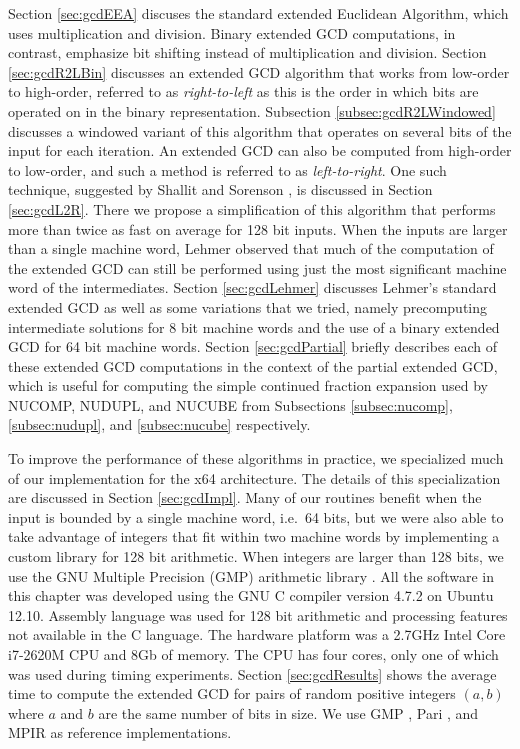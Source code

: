 \documentclass{ucalgthes1}
\theoremstyle{definition}
\newcommand{\compiler}{GNU C compiler version 4.7.2}
\newcommand{\cpu}{2.7GHz Intel Core i7-2620M CPU}
\begin{document}
Section \ref{sec:gcdEEA} discuses the standard extended Euclidean Algorithm, which uses multiplication and division.  Binary extended GCD computations, in contrast, emphasize bit shifting instead of multiplication and division.  Section \ref{sec:gcdR2LBin} discusses an extended GCD algorithm that works from low-order to high-order, referred to as \emph{right-to-left} as this is the order in which bits are operated on in the binary representation.  Subsection \ref{subsec:gcdR2LWindowed} discusses a windowed variant of this algorithm that operates on several bits of the input for each iteration.  An extended GCD can also be computed from high-order to low-order, and such a method is referred to as \emph{left-to-right}.  One such technique, suggested by Shallit and Sorenson \cite{Shallit1994}, is discussed in Section \ref{sec:gcdL2R}.  There we propose a simplification of this algorithm that performs more than twice as fast on average for 128 bit inputs.  When the inputs are larger than a single machine word, Lehmer \cite{Lehmer1938} observed that much of the computation of the extended GCD can still be performed using just the most significant machine word of the intermediates.  Section \ref{sec:gcdLehmer} discusses Lehmer's standard extended GCD as well as some variations that we tried, namely precomputing intermediate solutions for 8 bit machine words and the use of a binary extended GCD for 64 bit machine words.  Section \ref{sec:gcdPartial} briefly describes each of these extended GCD computations in the context of the partial extended GCD, which is useful for computing the simple continued fraction expansion used by NUCOMP, NUDUPL, and NUCUBE from Subsections \ref{subsec:nucomp}, \ref{subsec:nudupl}, and \ref{subsec:nucube} respectively.

To improve the performance of these algorithms in practice, we specialized much of our implementation for the x64 architecture.  The details of this specialization are discussed in Section \ref{sec:gcdImpl}.  Many of our routines benefit when the input is bounded by a single machine word, i.e.\ 64 bits, but we were also able to take advantage of integers that fit within two machine words by implementing a custom library for 128 bit arithmetic.  When integers are larger than 128 bits, we use the GNU Multiple Precision (GMP) arithmetic library \cite{Gmp}.  All the software in this chapter was developed using the \compiler{} on Ubuntu 12.10.  Assembly language was used for 128 bit arithmetic and processing features not available in the C language.  The hardware platform was a \cpu{} and 8Gb of memory.  The CPU has four cores, only one of which was used during timing experiments.  Section \ref{sec:gcdResults} shows the average time to compute the extended GCD for pairs of random positive integers $(a, b)$ where $a$ and $b$ are the same number of bits in size.  We use GMP \cite{Gmp}, Pari \cite{PariGP}, and MPIR \cite{Mpir} as reference implementations.
\end{document}
